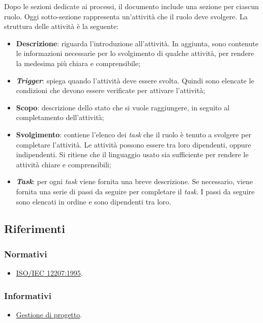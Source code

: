 Dopo le sezioni dedicate ai processi, il documento include una sezione per
ciascun ruolo. Oggi sotto-sezione rappresenta un'attività che il ruolo deve
svolgere.  La struttura delle attività è la seguente:
\begin{itemize}
	\item \textbf{Descrizione}: riguarda l'introduzione all'attività.
	      In aggiunta, sono contenute le informazioni necessarie per lo
	      svolgimento di qualche attività, per rendere la medesima più chiara e
	      comprensibile;

	\item \textbf{\textit{Trigger}}: spiega quando l'attività deve essere
	      svolta. Quindi sono elencate le condizioni che devono essere
	      verificate per attivare l'attività;

	\item \textbf{Scopo}: descrizione dello stato che si vuole raggiungere, in
	      seguito al completamento dell'attività;

	\item \textbf{Svolgimento}: contiene l'elenco dei \textit{task} che il
	      ruolo è tenuto a svolgere per completare l'attività. Le attività
	      possono essere tra loro dipendenti, oppure indipendenti. Si ritiene
	      che il linguaggio usato sia sufficiente per rendere le attività
	      chiare e comprensibili;

	\item \textbf{\textit{Task}}: per ogni \textit{task} viene fornita una
	      breve descrizione. Se necessario, viene fornita una serie di passi da
	      seguire per completare il \textit{task}. I passi da seguire sono
	      elencati in ordine e sono dipendenti tra loro.
\end{itemize}

\subsection{Riferimenti}
\subsubsection{Normativi}
\begin{itemize}
	\item \href{https://www.math.unipd.it/~tullio/IS-1/2009/Approfondimenti/ISO_12207-1995.pdf}{ISO/IEC 12207:1995}.
\end{itemize}

\subsubsection{Informativi}
\begin{itemize}
	\item \href{https://www.math.unipd.it/~tullio/IS-1/2023/Dispense/T4.pdf}{Gestione di progetto}.
\end{itemize}
